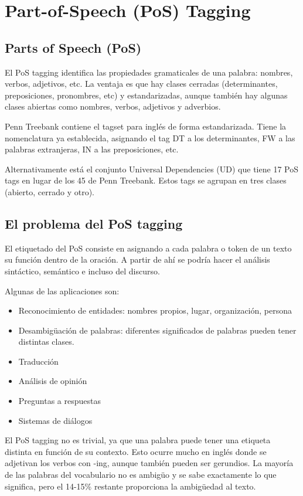 \chapter{Part-of-Speech (PoS) Tagging}
\section{Parts of Speech (PoS)}
El PoS tagging identifica las propiedades gramaticales de una palabra: nombres, verbos, adjetivos, etc. La ventaja es que hay clases cerradas (determinantes, preposiciones, pronombres, etc) y estandarizadas, aunque también hay algunas clases abiertas como nombres, verbos, adjetivos y adverbios. 

Penn Treebank contiene el tagset para inglés de forma estandarizada. Tiene la nomenclatura ya establecida, asignando el tag DT a los determinantes, FW a las palabras extranjeras, IN a las preposiciones, etc. 

Alternativamente está el conjunto Universal Dependencies (UD) que tiene 17 PoS tags en lugar de los 45 de Penn Treebank. Estos tags se agrupan en tres clases (abierto, cerrado y otro). 

\section{El problema del PoS tagging}
El etiquetado del PoS consiste en asignando a cada palabra o token de un texto su función dentro de la oración. A partir de ahí se podría hacer el análisis sintáctico, semántico e incluso del discurso. 

Algunas de las aplicaciones son:
\begin{itemize}
\item Reconocimiento de entidades: nombres propios, lugar, organización, persona
\item Desambigüación de palabras: diferentes significados de palabras pueden tener distintas clases.
\item Traducción
\item Análisis de opinión
\item Preguntas a respuestas
\item Sistemas de diálogos
\end{itemize}

El PoS tagging no es trivial, ya que una palabra puede tener una etiqueta distinta en función de su contexto. Esto ocurre mucho en inglés donde se adjetivan los verbos con -ing, aunque también pueden ser gerundios. La mayoría de las palabras del vocabulario no es ambigüo y se sabe exactamente lo que significa, pero el 14-15\% restante proporciona la ambigüedad al texto. 

